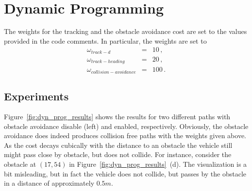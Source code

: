 
\section{Dynamic Programming}
The weights for the tracking and the obstacle avoidance cost are set to the values provided in the code comments.
In particular, the weights are set to
\begin{eqnarray}
	\omega_{track-d} &=& 10\, ,\\
	\omega_{track-heading} &=& 20\, ,\\
	\omega_{collision-avoidance} &=& 100 \, .
\end{eqnarray}
\subsection{Experiments}
Figure~\ref{fig:dyn_prog_results} shows the results for two different paths with obstacle avoidance disable (left) and enabled, respectively.
Obviously, the obstacle avoidance does indeed produces collision free paths with the weights given above.
As the cost decays cubically with the distance to an obstacle the vehicle still might pass close by obstacle, but does not collide.
For instance, consider the obstacle at $(17, 54)$ in Figure~\ref{fig:dyn_prog_results}~(d).
The visualization is a bit misleading, but in fact the vehicle does not collide, but passes by the obstacle in a distance of approximately $0.5m$.

